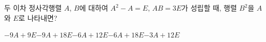 \hspace*{2mm}\begin{minipage}[t]{\dimexpr\linewidth-2mm\relax}\vspace{0pt}
두 이차 정사각행렬 $A$, $B$에 대하여 $A^2-A=E$, $AB=3E$가 성립할 때, 행렬 $B^2$을 $A$와 $E$로 나타내면?
\begin{choicesii}{$-9A+9E$}{$-9A+18E$}{$-6A+12E$}{$-6A+18E$}{$-3A+12E$}\end{choicesii}\end{minipage}
